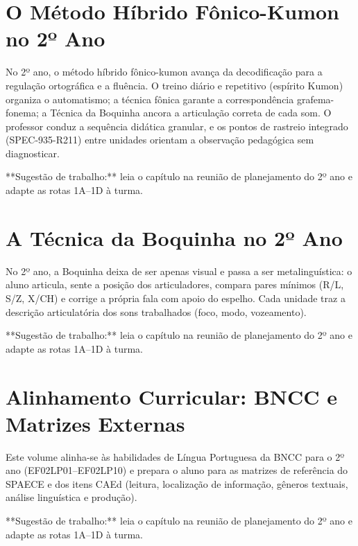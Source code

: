 
\chapter{O Método Híbrido Fônico-Kumon no 2º Ano}

No 2º ano, o método híbrido fônico-kumon avança da decodificação para a regulação ortográfica e a fluência. O treino diário e repetitivo (espírito Kumon) organiza o automatismo; a técnica fônica garante a correspondência grafema-fonema; a Técnica da Boquinha ancora a articulação correta de cada som. O professor conduz a sequência didática granular, e os pontos de rastreio integrado (SPEC-935-R211) entre unidades orientam a observação pedagógica sem diagnosticar.


\begin{dica}
**Sugestão de trabalho:** leia o capítulo na reunião de planejamento do 2º ano e adapte as rotas 1A–1D à turma.
\end{dica}

\chapter{A Técnica da Boquinha no 2º Ano}

No 2º ano, a Boquinha deixa de ser apenas visual e passa a ser metalinguística: o aluno articula, sente a posição dos articuladores, compara pares mínimos (R/L, S/Z, X/CH) e corrige a própria fala com apoio do espelho. Cada unidade traz a descrição articulatória dos sons trabalhados (foco, modo, vozeamento).


\begin{dica}
**Sugestão de trabalho:** leia o capítulo na reunião de planejamento do 2º ano e adapte as rotas 1A–1D à turma.
\end{dica}

\chapter{Alinhamento Curricular: BNCC e Matrizes Externas}

Este volume alinha-se às habilidades de Língua Portuguesa da BNCC para o 2º ano (EF02LP01--EF02LP10) e prepara o aluno para as matrizes de referência do SPAECE e dos itens CAEd (leitura, localização de informação, gêneros textuais, análise linguística e produção).


\begin{dica}
**Sugestão de trabalho:** leia o capítulo na reunião de planejamento do 2º ano e adapte as rotas 1A–1D à turma.
\end{dica}

